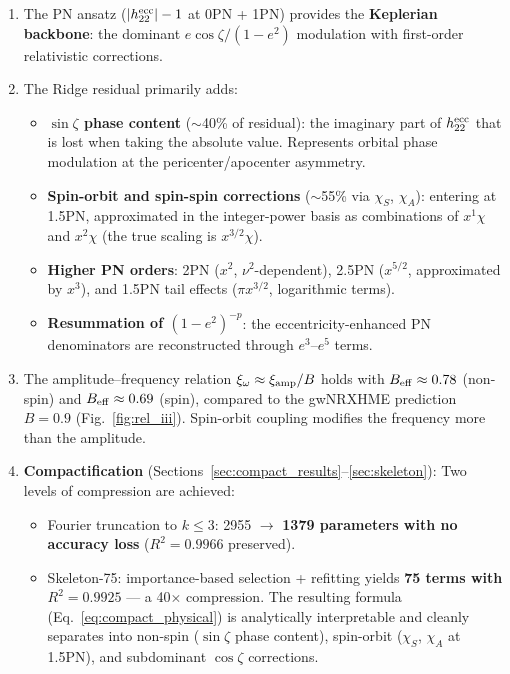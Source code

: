 \documentclass[11pt,letterpaper]{article}
\newcommand{\xamp}{\xi_{\rm amp}}
\newcommand{\xomg}{\xi_{\omega}}
\newcommand{\chiS}{\chi_S}
\newcommand{\chiA}{\chi_A}
\begin{document}
\begin{enumerate}[nosep]
\item The PN ansatz ($|h_{22}^{\rm ecc}| - 1$ at 0PN + 1PN) provides the \textbf{Keplerian backbone}: the dominant $e\cos\zeta/(1-e^2)$ modulation with first-order relativistic corrections.

\item The Ridge residual primarily adds:
\begin{itemize}[nosep]
\item[$\triangleright$] \textbf{$\sin\zeta$ phase content} ($\sim$40\% of residual): the imaginary part of $h_{22}^{\rm ecc}$ that is lost when taking the absolute value. Represents orbital phase modulation at the pericenter/apocenter asymmetry.

\item[$\triangleright$] \textbf{Spin-orbit and spin-spin corrections} ($\sim$55\% via $\chiS$, $\chiA$): entering at 1.5PN, approximated in the integer-power basis as combinations of $x^1\chi$ and $x^2\chi$ (the true scaling is $x^{3/2}\chi$).

\item[$\triangleright$] \textbf{Higher PN orders}: 2PN ($x^2$, $\nu^2$-dependent), 2.5PN ($x^{5/2}$, approximated by $x^3$), and 1.5PN tail effects ($\pi x^{3/2}$, logarithmic terms).

\item[$\triangleright$] \textbf{Resummation of $(1-e^2)^{-p}$}: the eccentricity-enhanced PN denominators are reconstructed through $e^3$--$e^5$ terms.
\end{itemize}

\item The amplitude--frequency relation $\xomg \approx \xamp/B$ holds with $B_{\rm eff} \approx 0.78$ (non-spin) and $B_{\rm eff} \approx 0.69$ (spin), compared to the gwNRXHME prediction $B = 0.9$ (Fig.~\ref{fig:rel_iii}). Spin-orbit coupling modifies the frequency more than the amplitude.

\item \textbf{Compactification} (Sections~\ref{sec:compact_results}--\ref{sec:skeleton}): Two levels of compression are achieved:
\begin{itemize}[nosep]
\item Fourier truncation to $k \leq 3$: 2955 $\to$ \textbf{1379 parameters with no accuracy loss} ($R^2 = 0.9966$ preserved).
\item Skeleton-75: importance-based selection + refitting yields \textbf{75 terms with $R^2 = 0.9925$} --- a 40$\times$ compression. The resulting formula (Eq.~\ref{eq:compact_physical}) is analytically interpretable and cleanly separates into non-spin ($\sin\zeta$ phase content), spin-orbit ($\chiS$, $\chiA$ at 1.5PN), and subdominant $\cos\zeta$ corrections.
\end{itemize}
\end{enumerate}
\end{document}
